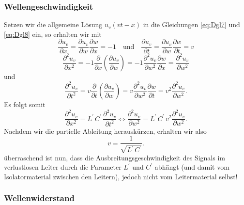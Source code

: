 \documentclass[paper=a4, parskip=half-, ngerman, fontsize=11pt]{scrreprt}
\begin{document}
\subsubsection{Wellengeschwindigkeit}

Setzen wir die allgemeine Lösung $u_{v}(v t - x)$ in die Gleichungen \eqref{eq:Dgl7} und \eqref{eq:Dgl8} ein, so
erhalten wir mit
\begin{equation*}
    \frac{\partial u_{v}}{\partial x} = \frac{\partial u_{v}}{\partial w} \frac{\partial w}{\partial x} = -1
    \quad \text{und} \quad
    \frac{\partial u_{v}}{\partial t} = \frac{\partial u_{v}}{\partial w} \frac{\partial w}{\partial t} = v
\end{equation*}
\begin{equation*}
    \frac{\partial^{2} u_{v}}{\partial x^{2}} = -1 \frac{\partial}{\partial x} \left( \frac{\partial u_{v}}{\partial w}
    \right) = -1 \frac{\partial^{2} u_{v}}{\partial w^{2}} \frac{\partial w}{\partial x} = \frac{\partial^{2}
    u_{v}}{\partial w^{2}}
\end{equation*}
und
\begin{equation*}
    \frac{\partial^{2} u_{v}}{\partial t^{2}} = v \frac{\partial}{\partial t} \left( \frac{\partial u_{v}}{\partial w}
    \right) = v \frac{\partial^{2} u_{v}}{\partial w^{2}} \frac{\partial w}{\partial t} =v^{2} \frac{\partial^{2}
        u_{v}}{\partial w^{2}}.
\end{equation*}
Es folgt somit
\begin{equation*}
    \frac{\partial^{2} u_{v}}{\partial x^{2}} = L^{\prime} \, C^{\prime} \, \frac{\partial^{2} u_{v}}{\partial t^{2}}
    \Leftrightarrow
    \frac{\partial^{2} u_{v}}{\partial w^{2}} = L^{\prime} \, C^{\prime} \, v^{2} \frac{\partial^{2} u_{v}}{\partial
    w^{2}}.
\end{equation*}
Nachdem wir die partielle Ableitung herauskürzen, erhalten wir also
\begin{equation}
    v = \frac{1}{\sqrt{L^{\prime} \, C^{\prime}}} \label{eq:WellenGeschw1}.
\end{equation}
überraschend ist nun, dass die Ausbreitungsgeschwindigkeit des Signals im verlustlosen Leiter durch die Parameter
$L^{\prime}$ und $C^{\prime}$ abhängt (und damit vom Isolatormaterial zwischen den Leitern), jedoch nicht vom
Leitermaterial selbst!


\subsubsection{Wellenwiderstand}
\end{document}
